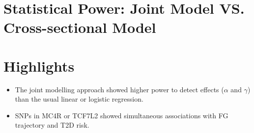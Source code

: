 \documentclass[10pt,a0,portrait]{a0poster}
\begin{document}
\begin{multicols}{2}




\section*{Statistical Power: \large{Joint Model VS. Cross-sectional Model}}
\begin{center}
    \large{}
    \label{Tab2}
\end{center}



\section*{Highlights}
\vspace{-1cm}
\begin{itemize}
\item The \textcolor{maroon2}{joint modelling} approach showed \textcolor{maroon2}{higher power} to detect effects (\textcolor{springgreen3}{$\alpha$} and \textcolor{springgreen3}{$\gamma$}) than the usual linear or logistic regression.
\item SNPs in \textcolor{maroon2}{MC4R} or \textcolor{maroon2}{TCF7L2} showed \textcolor{maroon2}{simultaneous associations} with FG trajectory and T2D risk.
\end{itemize}


\end{multicols}
\end{document}
